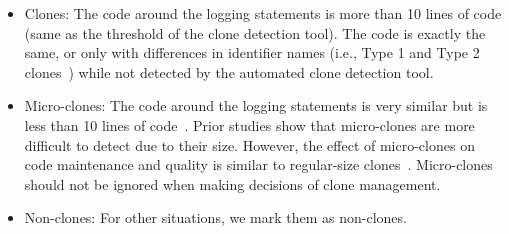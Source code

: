 \begin{itemize}\itemsep 0em
    \item Clones: %
    The code around the logging statements is more than 10 lines of code (same as the threshold of the clone detection tool). The code is exactly the same, or only with differences in identifier names (i.e., Type 1 and Type 2 clones~\cite{CompareCloneDetectionTools2007}) while not detected by the automated clone detection tool.

    \item Micro-clones: The code around the logging statements is very similar but is less than 10 lines of code~\cite{microclones}. Prior studies show that micro-clones are more difficult to detect due to their size. However, the effect of micro-clones on code maintenance and quality is similar to regular-size clones~\cite{MicroclonesAndBugsICPC, MicroclonesAndBugsSANER}. Micro-clones should not be ignored when making decisions of clone management.
     \item Non-clones: For other situations, we mark them as non-clones.
\end{itemize}


